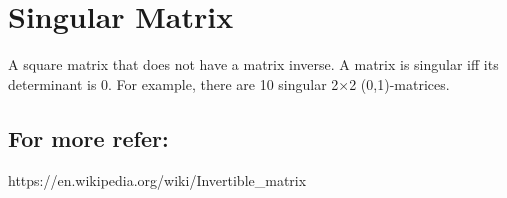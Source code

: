 \chapter{Singular Matrix}
A square matrix that does not have a matrix inverse. A matrix is singular iff its determinant is 0.
For example, there are 10 singular 2×2 (0,1)-matrices.


\section{For more refer:}
https://en.wikipedia.org/wiki/Invertible_matrix